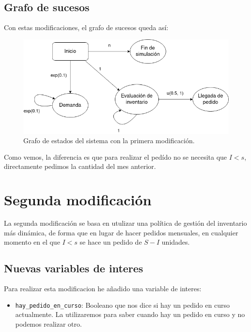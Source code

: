 \documentclass[12pt, spanish]{article}
\begin{document}
\newpage

\subsection{Grafo de sucesos}

Con estas modificaciones, el grafo de sucesos queda así:

\begin{figure}[H]
  \centering
   \includegraphics[width=\textwidth]{grafo_sucesos_mod1.png}
	\caption{Grafo de estados del sistema con la primera modificación.}
\end{figure}

Como vemos, la diferencia es que para realizar el pedído no se necesita que $I < s$, directamente pedimos la cantidad del mes anterior.

\section{Segunda modificación}

La segunda modificación se basa en utulizar una política de gestión del inventario más dinámica, de forma que en lugar de hacer pedidos mensuales, en cualquier momento en el que $I < s$ se hace un pedido de $S - I$ unidades.

\subsection{Nuevas variables de interes}

Para realizar esta modificacion he añadido una variable de interes:

\begin{itemize}
	\item \texttt{hay\_pedido\_en\_curso}: Booleano que nos dice si hay un pedido en curso actualmente. La utilizaremos para saber cuando hay un pedido en curso y no podemos realizar otro.
\end{itemize}
\end{document}
